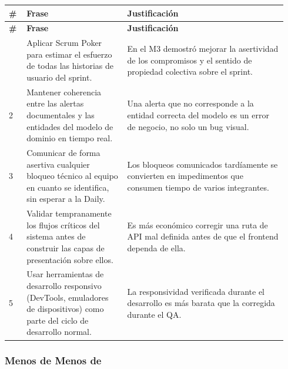 \documentclass[11pt,a4paper]{article}
\begin{document}
\begingroup
\scriptsize
\setlength{\tabcolsep}{3pt}
\begin{longtable}{P{0.06\linewidth}P{0.34\linewidth}P{0.54\linewidth}}
\toprule
\textbf{\#} & \textbf{Frase} & \textbf{Justificación} \\
\midrule
\endfirsthead
\toprule
\textbf{\#} & \textbf{Frase} & \textbf{Justificación} \\
\midrule
\endhead
\bottomrule
{} & Aplicar Scrum Poker para estimar el esfuerzo de todas las historias de usuario del sprint. & En el M3 demostró mejorar la asertividad de los compromisos y el sentido de propiedad colectiva sobre el sprint. \\
2 & Mantener coherencia entre las alertas documentales y las entidades del modelo de dominio en tiempo real. & Una alerta que no corresponde a la entidad correcta del modelo es un error de negocio, no solo un bug visual. \\
3 & Comunicar de forma asertiva cualquier bloqueo técnico al equipo en cuanto se identifica, sin esperar a la Daily. & Los bloqueos comunicados tardíamente se convierten en impedimentos que consumen tiempo de varios integrantes. \\
4 & Validar tempranamente los flujos críticos del sistema antes de construir las capas de presentación sobre ellos. & Es más económico corregir una ruta de API mal definida antes de que el frontend dependa de ella. \\
5 & Usar herramientas de desarrollo responsivo (DevTools, emuladores de dispositivos) como parte del ciclo de desarrollo normal. & La responsividad verificada durante el desarrollo es más barata que la corregida durante el QA. \\
\end{longtable}
\endgroup

\subsubsection{Menos de Menos de}
\end{document}

